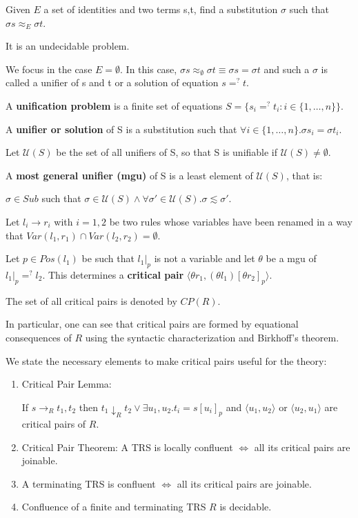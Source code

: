 \begin{definition}
Given $E$ a set of identities and two terms s,t, find a substitution $\sigma$ such that $\sigma s \approx_E \sigma t$. 

It is an undecidable problem.

We focus in the case $E = \emptyset$. In this case, $\sigma s \approx_\emptyset \sigma t \equiv \sigma s = \sigma t$ and such a $\sigma$ is called a unifier of s and t or a solution of equation $s =^{?} t$.

A \textbf{unification problem} is a finite set of equations $S = \{s_i =^? t_i:i \in \{1,\ldots,n \}\}$. 

A \textbf{unifier or solution} of S is a substitution such that $\forall i \in \{1,\ldots,n\}.\sigma s_i = \sigma t_i$. 

Let $\mathcal{U}(S)$ be the set of all unifiers of S, so that S is unifiable if $\mathcal{U}(S) \neq \emptyset$.

A \textbf{most general unifier (mgu)} of S is a least element of $\mathcal{U}(S)$, that is: 

$\sigma \in Sub$ such that $\sigma \in \mathcal{U}(S) \land \forall \sigma' \in \mathcal{U}(S). \sigma \lesssim \sigma'$.   
\end{definition}

\begin{definition}
Let $l_i \to r_i$ with $i = 1,2$ be two rules whose variables have been renamed in a way that $Var(l_1,r_1) \cap Var(l_2,r_2) = \emptyset$. 

Let $p \in Pos(l_1)$ be such that $l_1|_p$ is not a variable and let $\theta$ be a mgu of $l_1|_p =^{?} l_2$. This determines a \textbf{critical pair} $\langle \theta r_1,(\theta l_1)[\theta r_2]_p \rangle$.

The set of all critical pairs is denoted by $CP(R)$. 
\end{definition}

In particular, one can see that critical pairs are formed by equational consequences of $R$ using the syntactic characterization and Birkhoff's theorem. 

\begin{proposition}
We state the necessary elements to make critical pairs useful for the theory:

\begin{enumerate}
\item Critical Pair Lemma: 

If $s \to_R t_1,t_2$ then $t_1 \downarrow_R t_2 \lor \exists u_1,u_2. t_i = s[u_i]_p$ and $\langle u_1,u_2 \rangle$ or $\langle u_2,u_1 \rangle$ are critical pairs of $R$. 
\item Critical Pair Theorem: A TRS is locally confluent $\iff$ all its critical pairs are joinable. 
\item A terminating TRS is confluent $\iff$ all its critical pairs are joinable.
\item Confluence of a finite and terminating TRS $R$ is decidable. 
\end{enumerate}
\end{proposition}

